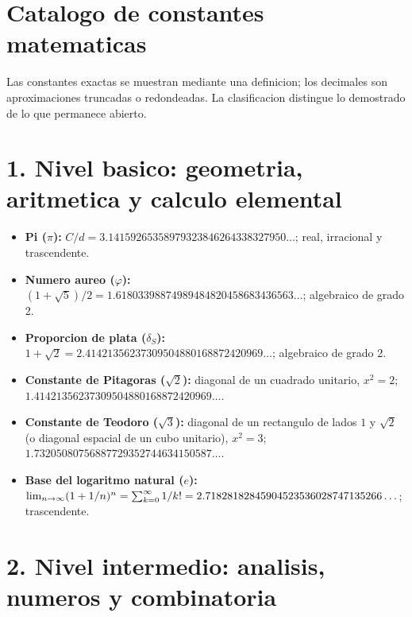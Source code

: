 \documentclass[11pt,a4paper]{article}
\begin{document}
\section*{Catalogo de constantes matematicas}

Las constantes exactas se muestran mediante una definicion; los decimales son aproximaciones truncadas o redondeadas. La clasificacion distingue lo demostrado de lo que permanece abierto.

\section*{1. Nivel basico: geometria, aritmetica y calculo elemental}

\begin{itemize}
\footnotesize
  \item \textbf{Pi ($\pi$):} $C/d=3.14159265358979323846264338327950\ldots$; real, irracional y trascendente.
  \item \textbf{Numero aureo ($\varphi$):} $(1+\sqrt5)/2=1.61803398874989484820458683436563\ldots$; algebraico de grado 2.
  \item \textbf{Proporcion de plata ($\delta_S$):} $1+\sqrt2=2.41421356237309504880168872420969\ldots$; algebraico de grado 2.
  \item \textbf{Constante de Pitagoras ($\sqrt2$):} diagonal de un cuadrado unitario, $x^2=2$;\newline $1.41421356237309504880168872420969\ldots$.
  \item \textbf{Constante de Teodoro ($\sqrt3$):} diagonal de un rectangulo de lados $1$ y $\sqrt2$ (o diagonal espacial de un cubo unitario), $x^2=3$;\newline $1.73205080756887729352744634150587\ldots$.
  \item \textbf{Base del logaritmo natural ($e$):} $\lim_{n\to\infty}(1+1/n)^n=\sum_{k=0}^\infty1/k!=\newline 2.71828182845904523536028747135266\ldots$; trascendente.
\end{itemize}

\section*{2. Nivel intermedio: analisis, numeros y combinatoria}
\end{document}
